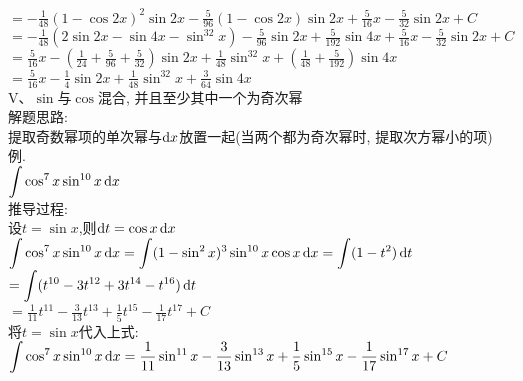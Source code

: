 \phantom{$\displaystyle\therefore\int\sin^6x\dif x$}$\displaystyle=-\frac{1}{48}(1-\cos2x)^2\sin2x-\frac{5}{96}(1-\cos2x)\sin2x+\frac{5}{16}x-\frac{5}{32}\sin2x+C$\\
\phantom{$\displaystyle\therefore\int\sin^6x\dif x$}$\displaystyle=-\frac{1}{48}(2\sin2x-\sin4x-\sin^32x)-\frac{5}{96}\sin2x+\frac{5}{192}\sin4x+\frac{5}{16}x-\frac{5}{32}\sin2x+C$\\
\phantom{$\displaystyle\therefore\int\sin^6x\dif x$}$\displaystyle=\frac{5}{16}x-(\frac{1}{24}+\frac{5}{96}+\frac{5}{32})\sin2x+\frac{1}{48}\sin^32x+(\frac{1}{48}+\frac{5}{192})\sin4x$\\
\phantom{$\displaystyle\therefore\int\sin^6x\dif x$}$\displaystyle=\frac{5}{16}x-\frac{1}{4}\sin2x+\frac{1}{48}\sin^32x+\frac{3}{64}\sin4x$\\

V、$\sin$与$\cos$混合, 并且至少其中一个为奇次幂\\
解题思路:\\
提取奇数幂项的单次幂与$\mathop{}\!\mathrm{d} x$放置一起(当两个都为奇次幂时, 提取次方幂小的项)\\
例.\\
\phantom{例}$\displaystyle\int\cos^7x\sin^{10}x\mathop{}\!\mathrm{d} x$\\
推导过程:\\
设$t=\sin x$,则$\mathop{}\!\mathrm{d} t=\cos x\mathop{}\!\mathrm{d} x$\\
$\displaystyle\int\cos^7x\sin^{10}x\mathop{}\!\mathrm{d} x=\int(1-\sin^2x)^3\sin^{10}x\cos x\mathop{}\!\mathrm{d} x=\int(1-t^2)\mathop{}\!\mathrm{d} t$\\
$\displaystyle=\int(t^{10}-3t^{12}+3t^{14}-t^{16})\mathop{}\!\mathrm{d} t$\\
$\displaystyle=\frac{1}{11}t^{11}-\frac{3}{13}t^{13}+\frac{1}{5}t^{15}-\frac{1}{17}t^{17}+C$\\
将$t=\sin x$代入上式:\\
$\displaystyle\int\cos^7x\sin^{10}x\mathop{}\!\mathrm{d} x=\frac{1}{11}\sin^{11}x-\frac{3}{13}\sin^{13}x+\frac{1}{5}\sin^{15}x-\frac{1}{17}\sin^{17}x+C$\\


